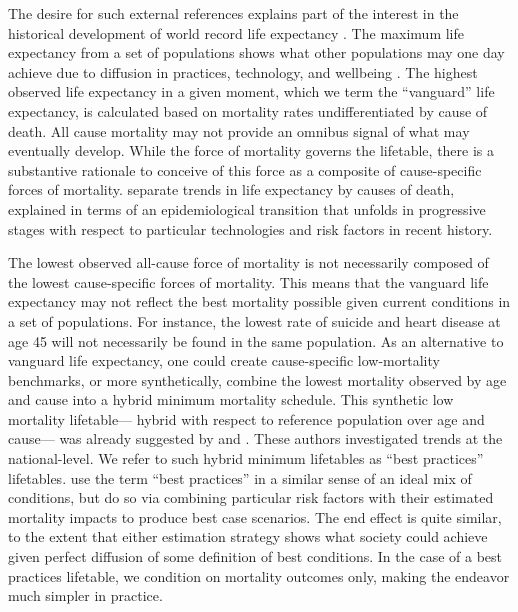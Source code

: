 \documentclass[11pt,oneside,a4paper]{article} %
\begin{document}
The desire for such external references explains part of the interest in the
historical development of world record life expectancy \citep{oeppen2002broken}.
The maximum life expectancy from a set of populations shows what other
populations may one day achieve due to diffusion in practices, technology, and
wellbeing \citep{vallin2010esperance}. The highest observed life expectancy in
a given moment, which we term the ``vanguard'' life expectancy, is calculated
based on mortality rates undifferentiated by cause of death. All cause mortality may not provide an omnibus signal of what may eventually develop. While the force of mortality governs the lifetable, there is a substantive rationale to conceive of
this force as a composite of cause-specific forces of mortality.
\citet{vallin2008minimum} separate trends in life expectancy by causes of death,
explained in terms of an epidemiological transition that unfolds in progressive
stages with respect to particular technologies and risk factors in recent
history. 

The lowest observed all-cause force of mortality is not
necessarily composed of the lowest cause-specific forces of mortality. This
means that the vanguard life expectancy may not reflect the best mortality possible given current conditions in a set of populations. For instance, the lowest rate of suicide and heart
disease at age 45 will not necessarily be found in the same population. As an
alternative to vanguard life expectancy, one could create cause-specific
low-mortality benchmarks, or more synthetically, combine the lowest mortality
observed by age and cause into a hybrid minimum mortality schedule. This synthetic low mortality lifetable--- hybrid with respect to reference population over age and cause--- was already suggested by \citet{wunsch1975minimum} and \citet{vallin2008minimum}. These authors investigated trends at the national-level. We refer to such hybrid minimum
lifetables as ``best practices'' lifetables. \citet{eikemo2014} use the term
``best practices'' in a similar sense of an ideal mix of conditions, but do so
via combining particular risk factors with their estimated mortality impacts to
produce best case scenarios. The end effect is quite similar, to the extent that
either estimation strategy shows what society could achieve given perfect
diffusion of some definition of best conditions. In the case of a best practices
lifetable, we condition on mortality outcomes only, making the endeavor much
simpler in practice.
\end{document}
